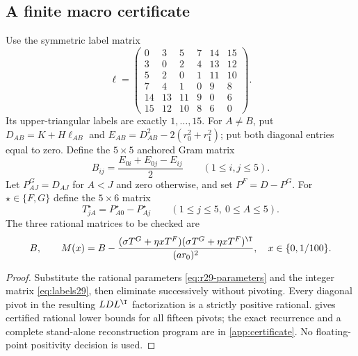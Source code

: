 \subsection{A finite macro certificate}

Use the symmetric label matrix
\begin{equation}\label{eq:labels29}
 \ell=\begin{pmatrix}
 0&3&5&7&14&15\\3&0&2&4&13&12\\5&2&0&1&11&10\\
 7&4&1&0&9&8\\14&13&11&9&0&6\\15&12&10&8&6&0
 \end{pmatrix}.
\end{equation}
Its upper-triangular labels are exactly $1,\ldots,15$. For $A\ne B$, put
$D_{AB}=K+H\ell_{AB}$ and $E_{AB}=D_{AB}^2-2(r_0^2+r_1^2)$; put both
diagonal entries equal to zero. Define the $5\times5$ anchored Gram matrix
\[
 B_{ij}=\frac{E_{0i}+E_{0j}-E_{ij}}2\qquad(1\le i,j\le5).
\]
Let $P^G_{AJ}=D_{AJ}$ for $A<J$ and zero otherwise, and set $P^F=D-P^G$.
For $\star\in\{F,G\}$ define the $5\times6$ matrix
\[
 T^\star_{jA}=P^\star_{A0}-P^\star_{Aj}\qquad(1\le j\le5,\ 0\le A\le5).
\]
The three rational matrices to be checked are
\begin{equation}\label{eq:three-matrices}
 B,\qquad M(x)=B-\frac{(\sigma T^G+\eta xT^F)(\sigma T^G+\eta xT^F)^\T}{(ar_0)^2},
 \quad x\in\{0,1/100\}.
\end{equation}

\begin{proof}
Substitute the rational parameters \eqref{eq:r29-parameters} and the
integer matrix \eqref{eq:labels29}, then eliminate successively without
pivoting. Every diagonal pivot in the resulting $LDL^\T$ factorization
is a strictly positive rational.  gives certified rational
lower bounds for all fifteen pivots; the exact recurrence and a complete
stand-alone reconstruction program are in \cref{app:certificate}.
No floating-point positivity decision is used.
\end{proof}



